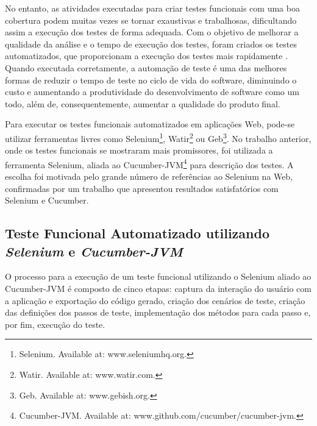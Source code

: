 \documentclass[12pt]{article}
\begin{document}
No entanto, as atividades executadas para criar testes funcionais com uma boa cobertura podem muitas vezes se tornar exaustivas e trabalhosas, dificultando assim a execução dos testes de forma adequada. Com o objetivo de melhorar a qualidade da análise e o tempo de execução dos testes, foram criados os testes automatizados, que proporcionam a execução dos testes mais rapidamente \cite{fantinato2005autotest}. Quando executada corretamente, a automação de teste é uma das melhores formas de reduzir o tempo de teste no ciclo de vida do software, diminuindo o custo e aumentando a produtividade do desenvolvimento de software como um todo, além de, consequentemente, aumentar a qualidade do produto final.

Para executar os testes funcionais automatizados em aplicações Web, pode-se utilizar ferramentas livres como Selenium\footnote{Selenium. Available at: www.seleniumhq.org.}, Watir\footnote{Watir. Available at: www.watir.com.} ou Geb\footnote{Geb. Available at: www.gebish.org.}. No trabalho anterior\cite{sbqs2015}, onde os testes funcionais se mostraram mais promissores, foi utilizada a ferramenta Selenium, aliada ao Cucumber-JVM\footnote{Cucumber-JVM. Available at: www.github.com/cucumber/cucumber-jvm.} para descrição dos testes. A escolha foi motivada pelo grande número de referências ao Selenium na Web, confirmadas por um trabalho que apresentou resultados satisfatórios com Selenium e Cucumber\cite{pannutest,sbqs2013}.



\subsection{Teste Funcional Automatizado utilizando \emph{Selenium} e \emph{Cucumber-JVM}}
O processo para a execução de um teste funcional utilizando o Selenium aliado ao Cucumber-JVM é composto de cinco etapas: captura da interação do usuário com a aplicação e exportação do código gerado, criação dos cenários de teste, criação das definições dos passos de teste, implementação dos métodos para cada passo e, por fim, execução do teste.
\end{document}
